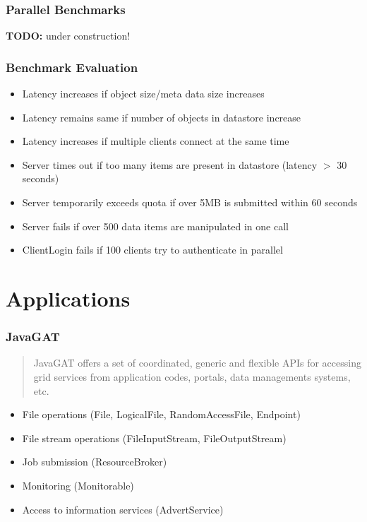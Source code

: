 \documentclass{beamer}
\begin{document}
\frame
{
	\frametitle{Parallel Benchmarks}
	\textbf{TODO:} under construction!
}

\frame
{
	\frametitle{Benchmark Evaluation}
	\begin{itemize}
    	\item Latency increases if object size/meta data size increases
    	\item Latency remains same if number of objects in datastore increase
    	\item Latency increases if multiple clients connect at the same time
    	\item Server times out if too many items are present in datastore (latency
    		$>$ 30 seconds)
    	\item Server temporarily exceeds quota if over 5MB is submitted within
    		60 seconds
    	\item Server fails if over 500 data items are manipulated in one call
    	\item ClientLogin fails if 100 clients try to authenticate in parallel
    \end{itemize}
}

\section{Applications}
\frame
{
	\frametitle{JavaGAT}
	\begin{quote}
		JavaGAT offers a set of coordinated, generic and flexible APIs for accessing
		grid services from application codes, portals, data managements systems, etc.
	\end{quote}
	
	\begin{itemize}
		\item File operations (File, LogicalFile, RandomAccessFile, Endpoint)
		\item File stream operations (FileInputStream, FileOutputStream)
		\item Job submission (ResourceBroker)
		\item Monitoring (Monitorable)
		\item Access to information services (AdvertService)
	\end{itemize}
}
\end{document}
